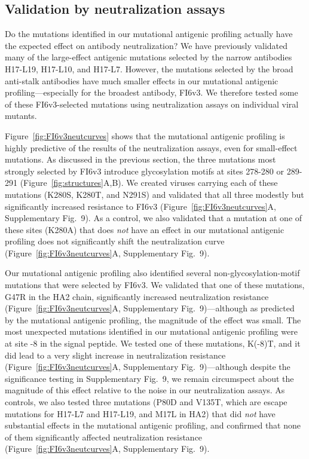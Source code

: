 \documentclass[11pt]{article}
\begin{document}
\subsection*{Validation by neutralization assays}
Do the mutations identified in our mutational antigenic profiling actually have the expected effect on antibody neutralization?
We have previously validated many of the large-effect antigenic mutations selected by the narrow antibodies H17-L19, H17-L10, and H17-L7\cite{doud2017complete}.
However, the mutations selected by the broad anti-stalk antibodies have much smaller effects in our mutational antigenic profiling---especially for the broadest antibody, FI6v3.
We therefore tested some of these FI6v3-selected mutations using neutralization assays on individual viral mutants.

Figure~\ref{fig:FI6v3neutcurves} shows that the mutational antigenic profiling is highly predictive of the results of the neutralization assays, even for small-effect mutations.
As discussed in the previous section, the three mutations most strongly selected by FI6v3 introduce glycosylation motifs at sites 278-280 or 289-291 (Figure~\ref{fig:structures}A,B).
We created viruses carrying each of these mutations (K280S, K280T, and N291S) and validated that all three modestly but significantly increased resistance to FI6v3 (Figure~\ref{fig:FI6v3neutcurves}A, Supplementary Fig.~9).
As a control, we also validated that a mutation at one of these sites (K280A) that does \emph{not} have an effect in our mutational antigenic profiling does not significantly shift the neutralization curve (Figure~\ref{fig:FI6v3neutcurves}A, Supplementary Fig.~9).

Our mutational antigenic profiling also identified several non-glycosylation-motif mutations that were selected by FI6v3.
We validated that one of these mutations, G47R in the HA2 chain, significantly increased neutralization resistance (Figure~\ref{fig:FI6v3neutcurves}A, Supplementary Fig.~9)---although as predicted by the mutational antigenic profiling, the magnitude of the effect was small.
The most unexpected mutations identified in our mutational antigenic profiling were at site -8 in the signal peptide.
We tested one of these mutations, K(-8)T, and it did lead to a very slight increase in neutralization resistance (Figure~\ref{fig:FI6v3neutcurves}A, Supplementary Fig.~9)---although despite the significance testing in Supplementary Fig.~9, we remain circumspect about the magnitude of this effect relative to the noise in our neutralization assays.
As controls, we also tested three mutations (P80D and V135T, which are escape mutations for H17-L7 and H17-L19, and M17L in HA2) that did \emph{not} have substantial effects in the mutational antigenic profiling, and confirmed that none of them significantly affected neutralization resistance (Figure~\ref{fig:FI6v3neutcurves}A, Supplementary Fig.~9).
\end{document}
